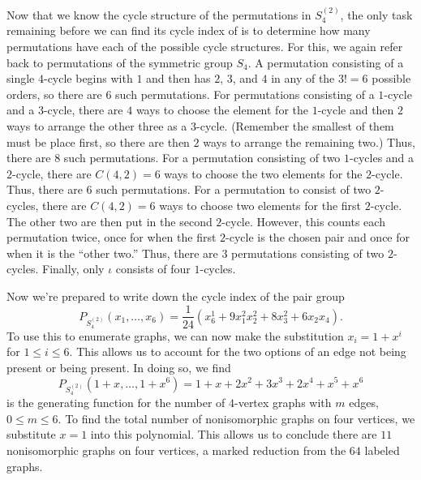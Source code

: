 Now that we know the cycle structure of the permutations in
$S_4^{(2)}$, the only task remaining before we can find its cycle
index of is to determine how many permutations have each of the
possible cycle structures. For this, we again refer back to
permutations of the symmetric group $S_4$. A permutation consisting of
a single $4$-cycle begins with $1$ and then has $2$, $3$, and $4$ in
any of the $3!=6$ possible orders, so there are $6$ such
permutations. For permutations consisting of a $1$-cycle and a
$3$-cycle, there are $4$ ways to choose the element for the $1$-cycle
and then $2$ ways to arrange the other three as a $3$-cycle. (Remember
the smallest of them must be place first, so there are then $2$ ways
to arrange the remaining two.) Thus, there are $8$ such
permutations. For a permutation consisting of two $1$-cycles and a
$2$-cycle, there are $C(4,2)=6$ ways to choose the two elements for
the $2$-cycle. Thus, there are $6$ such permutations. For a
permutation to consist of two $2$-cycles, there are $C(4,2)=6$ ways to
choose two elements for the first $2$-cycle. The other two are then
put in the second $2$-cycle. However, this counts each permutation
twice, once for when the first $2$-cycle is the chosen pair and once
for when it is the ``other two.'' Thus, there are $3$ permutations
consisting of two $2$-cycles. Finally, only $\iota$ consists of four
$1$-cycles.

Now we're prepared to write down the cycle index of the pair group
\[P_{S_4^{(2)}}(x_1,\dots,x_6) = \frac{1}{24}\left( x_6^1 + 9x_1^2x_2^2 + 8 x_3^2 +
  6x_2x_4\right).\]
To use this to enumerate graphs, we can now make the substitution $x_i
= 1+x^i$ for $1\leq i\leq 6$. This allows us to account for the two
options of an edge not being present or being present. In doing so, we
find
\[P_{S_4^{(2)}}(1+x,\dots,1+x^6)= 1+x+2 x^2+3 x^3+2 x^4+x^5+x^6\]
is the generating function for the number of $4$-vertex graphs with
$m$ edges, $0\leq m\leq 6$. To find the total number of nonisomorphic
graphs on four vertices, we substitute $x=1$ into this
polynomial. This allows us to conclude there are $11$ nonisomorphic
graphs on four vertices, a marked reduction from the $64$ labeled
graphs.

